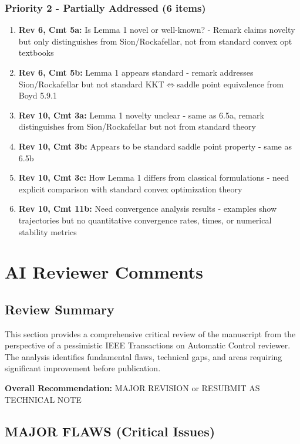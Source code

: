 \documentclass[journal,twoside,web]{ieeecolor}
\begin{document}
\subsubsection*{Priority 2 - Partially Addressed (6 items)}
\begin{enumerate}
\item \textbf{Rev 6, Cmt 5a:} Is Lemma 1 novel or well-known? - Remark claims novelty but only distinguishes from Sion/Rockafellar, not from standard convex opt textbooks
\item \textbf{Rev 6, Cmt 5b:} Lemma 1 appears standard - remark addresses Sion/Rockafellar but not standard KKT$\Leftrightarrow$saddle point equivalence from Boyd 5.9.1
\item \textbf{Rev 10, Cmt 3a:} Lemma 1 novelty unclear - same as 6.5a, remark distinguishes from Sion/Rockafellar but not from standard theory
\item \textbf{Rev 10, Cmt 3b:} Appears to be standard saddle point property - same as 6.5b
\item \textbf{Rev 10, Cmt 3c:} How Lemma 1 differs from classical formulations - need explicit comparison with standard convex optimization theory
\item \textbf{Rev 10, Cmt 11b:} Need convergence analysis results - examples show trajectories but no quantitative convergence rates, times, or numerical stability metrics
\end{enumerate}

\onecolumn

\section{AI Reviewer Comments}\label{section_ai_review}

\subsection*{Review Summary}

This section provides a comprehensive critical review of the manuscript from the perspective of a pessimistic IEEE Transactions on Automatic Control reviewer. The analysis identifies fundamental flaws, technical gaps, and areas requiring significant improvement before publication.

\textbf{Overall Recommendation:} MAJOR REVISION or RESUBMIT AS TECHNICAL NOTE

\subsection*{MAJOR FLAWS (Critical Issues)}
\end{document}
